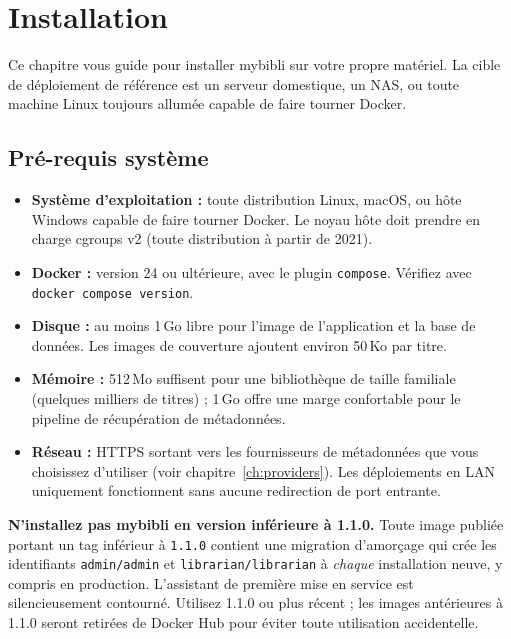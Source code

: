 \chapter{Installation}
\label{ch:installation}

Ce chapitre vous guide pour installer mybibli sur
votre propre matériel. La cible de déploiement de référence est un
serveur domestique, un NAS, ou toute machine Linux toujours allumée
capable de faire tourner Docker.

\section{Pré-requis système}

\begin{itemize}
  \item \textbf{Système d'exploitation :} toute distribution Linux,
        macOS, ou hôte Windows capable de faire tourner Docker. Le
        noyau hôte doit prendre en charge cgroups v2 (toute
        distribution à partir de 2021).
  \item \textbf{Docker :} version 24 ou ultérieure, avec le plugin
        \texttt{compose}. Vérifiez avec
        \texttt{docker compose version}.
  \item \textbf{Disque :} au moins 1\,Go libre pour l'image de
        l'application et la base de données. Les images de
        couverture ajoutent environ 50\,Ko par titre.
  \item \textbf{Mémoire :} 512\,Mo suffisent pour une bibliothèque de
        taille familiale (quelques milliers de titres) ; 1\,Go offre
        une marge confortable pour le pipeline de récupération de
        métadonnées.
  \item \textbf{Réseau :} HTTPS sortant vers les fournisseurs de
        métadonnées que vous
        choisissez d'utiliser (voir chapitre~\ref{ch:providers}). Les
        déploiements en LAN uniquement fonctionnent sans aucune
        redirection de port entrante.
\end{itemize}

\begin{warning}
\textbf{N'installez pas mybibli en version inférieure à
1.1.0.} Toute image publiée portant un
tag inférieur à \texttt{1.1.0} contient une migration d'amorçage qui
crée les identifiants \texttt{admin/admin} et
\texttt{librarian/librarian} à \emph{chaque} installation neuve, y
compris en production. L'assistant de première mise en service est
silencieusement contourné. Utilisez 1.1.0 ou plus récent ; les images
antérieures à 1.1.0 seront retirées de Docker Hub pour éviter toute
utilisation accidentelle.
\end{warning}

